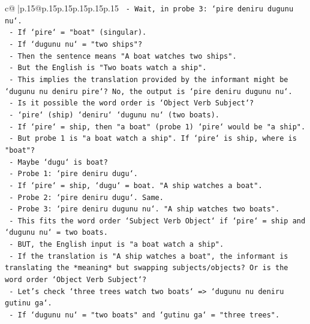 \documentclass{article}
\begin{document}
{\begin{supertabular}{c@{$\;$}|p{.15\linewidth}@{}p{.15\linewidth}p{.15\linewidth}p{.15\linewidth}p{.15\linewidth}p{.15\linewidth}}
{{{\texttt{             {-} Wait, in probe 3: `pire deniru dugunu nu`.} \\
\texttt{               {-} If `pire` = "boat" (singular).} \\
\texttt{               {-} If `dugunu nu` = "two ships"?} \\
\texttt{               {-} Then the sentence means "A boat watches two ships".} \\
\texttt{               {-} But the English is "Two boats watch a ship".} \\
\texttt{               {-} This implies the translation provided by the informant might be `dugunu nu deniru pire`? No, the output is `pire deniru dugunu nu`.} \\
\texttt{               {-} Is it possible the word order is `Object Verb Subject`?} \\
\texttt{                 {-} `pire` (ship) `deniru` `dugunu nu` (two boats).} \\
\texttt{                 {-} If `pire` = ship, then "a boat" (probe 1) `pire` would be "a ship".} \\
\texttt{                 {-} But probe 1 is "a boat watch a ship". If `pire` is ship, where is "boat"?} \\
\texttt{                 {-} Maybe `dugu` is boat?} \\
\texttt{                 {-} Probe 1: `pire deniru dugu`.} \\
\texttt{                   {-} If `pire` = ship, `dugu` = boat. "A ship watches a boat".} \\
\texttt{                   {-} Probe 2: `pire deniru dugu`. Same.} \\
\texttt{                   {-} Probe 3: `pire deniru dugunu nu`. "A ship watches two boats".} \\
\texttt{                   {-} This fits the word order `Subject Verb Object` if `pire` = ship and `dugunu nu` = two boats.} \\
\texttt{                   {-} BUT, the English input is "a boat watch a ship".} \\
\texttt{                   {-} If the translation is "A ship watches a boat", the informant is translating the *meaning* but swapping subjects/objects? Or is the word order `Object Verb Subject`?} \\
\texttt{                   {-} Let's check `three trees watch two boats` => `dugunu nu deniru gutinu ga`.} \\
\texttt{                     {-} If `dugunu nu` = "two boats" and `gutinu ga` = "three trees".} \\
}}}
\end{supertabular}}
\end{document}
